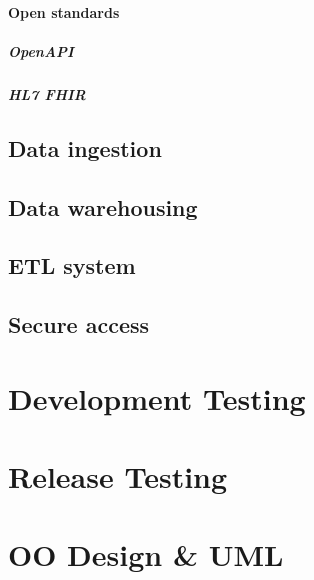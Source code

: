 \documentclass[10pt]{article}
\begin{document}
\paragraph{Open standards}
\subparagraph{OpenAPI}
\subparagraph{HL7 FHIR}

\subsection{Data ingestion}

\subsection{Data warehousing}

\subsection{ETL system}

\subsection{Secure access}

\newpage
\section{Development Testing}

\newpage
\section{Release Testing}

\newpage
\section{OO Design \& UML}

\printbibliography
\end{document}
